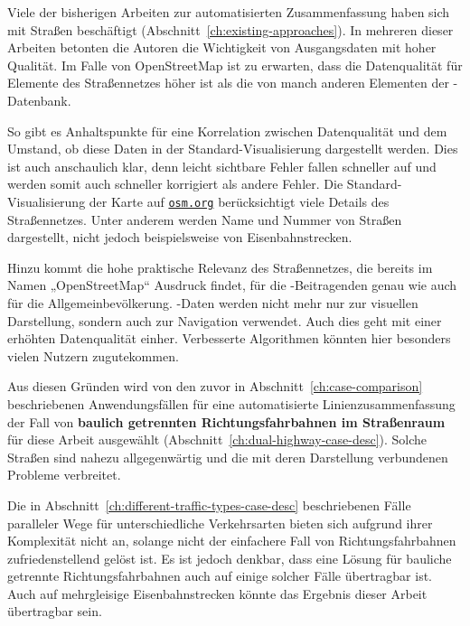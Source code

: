 \documentclass[../main/thesis.tex]{subfiles}
\begin{document}
Viele der bisherigen Arbeiten zur automatisierten Zusammenfassung haben sich mit Straßen beschäftigt (Abschnitt~\ref{ch:existing-approaches}).
In mehreren dieser Arbeiten betonten die Autoren die Wichtigkeit von Ausgangsdaten mit hoher Qualität.
Im Falle von OpenStreetMap ist zu erwarten, dass die Datenqualität für Elemente des Straßennetzes höher ist als die von manch anderen Elementen der \osm-Datenbank.

So gibt es Anhaltspunkte für eine Korrelation zwischen Datenqualität und dem Umstand, ob diese Daten in der Standard-Visualisierung dargestellt werden. 
Dies ist auch anschaulich klar, denn leicht sichtbare Fehler fallen schneller auf und werden somit auch schneller korrigiert als andere Fehler.
Die Standard-Visualisierung der Karte auf \href{https://www.openstreetmap.org/}{\nolinkurl{osm.org}} berücksichtigt viele Details des Straßennetzes.
Unter anderem werden Name und Nummer von Straßen dargestellt, nicht jedoch beispielsweise von Eisenbahnstrecken.

Hinzu kommt die hohe praktische Relevanz des Straßennetzes, die bereits im Namen „OpenStreetMap“ Ausdruck findet, für die \osm-Beitragenden genau wie auch für die Allgemeinbevölkerung.
\osm-Daten werden nicht mehr nur zur visuellen Darstellung, sondern auch zur Navigation verwendet.
Auch dies geht mit einer erhöhten Datenqualität einher. 
Verbesserte Algorithmen könnten hier besonders vielen Nutzern zugutekommen.

Aus diesen Gründen wird von den zuvor in Abschnitt~\ref{ch:case-comparison} beschriebenen Anwendungsfällen für eine automatisierte Linienzusammenfassung der Fall von \textbf{baulich getrennten Richtungsfahrbahnen im Straßenraum} für diese Arbeit ausgewählt (Abschnitt~\ref{ch:dual-highway-case-desc}).
Solche Straßen sind nahezu allgegenwärtig und die mit deren Darstellung verbundenen Probleme verbreitet.

Die in Abschnitt~\ref{ch:different-traffic-types-case-desc} beschriebenen Fälle paralleler Wege für unterschiedliche Verkehrsarten bieten sich aufgrund ihrer Komplexität nicht an, solange nicht der einfachere Fall von Richtungsfahrbahnen zufriedenstellend gelöst ist.
Es ist jedoch denkbar, dass eine Lösung für bauliche getrennte Richtungsfahrbahnen auch auf einige solcher Fälle übertragbar ist.
Auch auf mehrgleisige Eisenbahnstrecken könnte das Ergebnis dieser Arbeit übertragbar sein.
\end{document}
